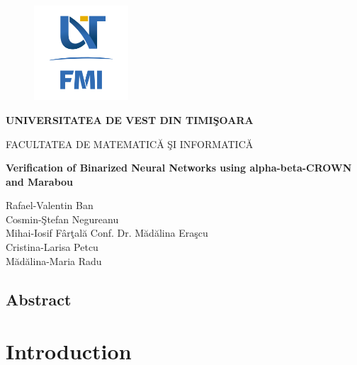 \documentclass[12pt,a4paper]{report}
\begin{document}
\thispagestyle{empty}
\begin{center}
\begin{figure}[h!]
\vspace{-20pt}
\begin{center}
\includegraphics[width=100pt]{FMI-03.png}
\end{center}
\end{figure}

{\large{\bf UNIVERSITATEA DE VEST DIN TIMI\c SOARA

FACULTATEA DE MATEMATIC\u A \c SI INFORMATIC\u A}}

\vspace{65pt}
{\huge {\bf Verification of Binarized Neural Networks using alpha-beta-CROWN and Marabou}}

\vspace{65pt}
\end{center}

\noindent Rafael-Valentin Ban\\
\noindent Cosmin-\c Stefan Negureanu\\
\noindent Mihai-Iosif F\^{a}r\c tal\u a \hfill Conf. Dr. M\u ad\u alina Era\c scu\\
\noindent Cristina-Larisa Petcu\\
\noindent M\u ad\u alina-Maria Radu\\

\vspace{65pt}
\section*{Abstract}
\tableofcontents

\chapter{Introduction}
\end{document}
